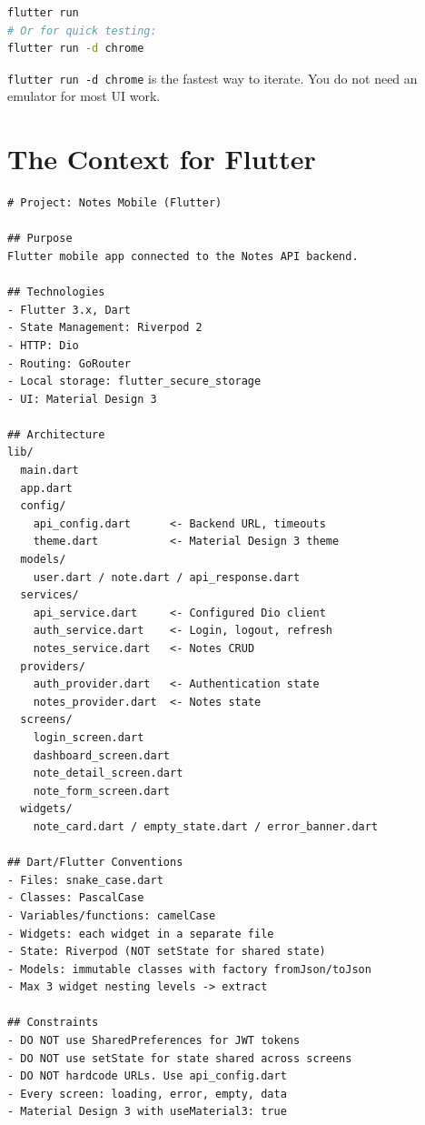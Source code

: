 \begin{praticabox}[title={Hands-on --- Verify it works}]
\begin{lstlisting}[language=bash]
flutter run
# Or for quick testing:
flutter run -d chrome
\end{lstlisting}
\end{praticabox}

\begin{tipbox}
\texttt{flutter run -d chrome} is the fastest way to iterate. You do not need an emulator for most UI work.
\end{tipbox}

\section{The Context for Flutter}

\begin{lstlisting}[language={},title={\texttt{\_CONTEXT.md} for Notes Mobile}]
# Project: Notes Mobile (Flutter)

## Purpose
Flutter mobile app connected to the Notes API backend.

## Technologies
- Flutter 3.x, Dart
- State Management: Riverpod 2
- HTTP: Dio
- Routing: GoRouter
- Local storage: flutter_secure_storage
- UI: Material Design 3

## Architecture
lib/
  main.dart
  app.dart
  config/
    api_config.dart      <- Backend URL, timeouts
    theme.dart           <- Material Design 3 theme
  models/
    user.dart / note.dart / api_response.dart
  services/
    api_service.dart     <- Configured Dio client
    auth_service.dart    <- Login, logout, refresh
    notes_service.dart   <- Notes CRUD
  providers/
    auth_provider.dart   <- Authentication state
    notes_provider.dart  <- Notes state
  screens/
    login_screen.dart
    dashboard_screen.dart
    note_detail_screen.dart
    note_form_screen.dart
  widgets/
    note_card.dart / empty_state.dart / error_banner.dart

## Dart/Flutter Conventions
- Files: snake_case.dart
- Classes: PascalCase
- Variables/functions: camelCase
- Widgets: each widget in a separate file
- State: Riverpod (NOT setState for shared state)
- Models: immutable classes with factory fromJson/toJson
- Max 3 widget nesting levels -> extract

## Constraints
- DO NOT use SharedPreferences for JWT tokens
- DO NOT use setState for state shared across screens
- DO NOT hardcode URLs. Use api_config.dart
- Every screen: loading, error, empty, data
- Material Design 3 with useMaterial3: true
\end{lstlisting}

